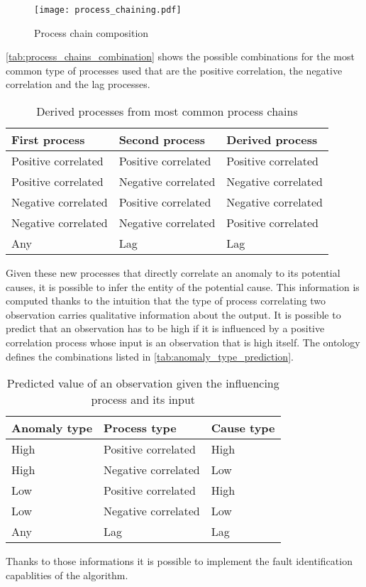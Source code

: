 \begin{figure}
  \centering
  \texttt{[image: process\_chaining.pdf]}
  \caption{Process chain composition}
  \label{fig:chain_composition}
\end{figure}
\autoref{tab:process_chains_combination} shows the possible combinations for the most common type of processes used that are the positive correlation, the negative correlation and the lag processes.
\begin{table}
  \centering
  \caption{Derived processes from most common process chains}
  \label{tab:process_chains_combination}
  \begin{tabular}{lll}
    \hline\textbf{First process} & \textbf{Second process} & \textbf{Derived process}\\\hline
    Positive correlated & Positive correlated & Positive correlated\\
    Positive correlated & Negative correlated & Negative correlated\\
    Negative correlated & Positive correlated & Negative correlated\\
    Negative correlated & Negative correlated & Positive correlated\\
    Any & Lag & Lag \\\hline
  \end{tabular}
\end{table}
Given these new processes that directly correlate an anomaly to its potential causes, it is possible to infer the entity of the potential cause. This information is computed thanks to the intuition that the type of process correlating two observation carries qualitative information about the output. It is possible to predict that an observation has to be high if it is influenced by a positive correlation process whose input is an observation that is high itself. The ontology defines the combinations listed in \autoref{tab:anomaly_type_prediction}.
\begin{table}
  \centering
  \caption{Predicted value of an observation given the influencing process and its input}
  \label{tab:anomaly_type_prediction}
  \begin{tabular}{lll}
    \hline\textbf{Anomaly type} & \textbf{Process type} & \textbf{Cause type}\\\hline
    High & Positive correlated & High\\
    High & Negative correlated & Low\\
    Low & Positive correlated & High\\
    Low & Negative correlated & Low \\
    Any & Lag & Lag \\\hline
  \end{tabular}
\end{table}
Thanks to those informations it is possible to implement the fault identification capablities of the algorithm.
